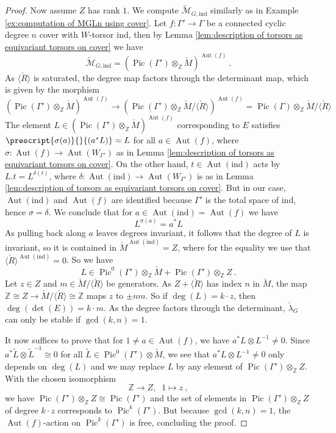 \documentclass[10pt, a4paper]{amsart}
\theoremstyle{definition}
\theoremstyle{myitemstyle}
\newcommand{\Z}{\mathbb{Z}}
\newcommand{\Mcheck}{{\check{M}}}
\newcommand{\lambdacheck}{\check{\lambda}}
\newcommand{\Rcheck}{\check{R}}
\newcommand{\wmc}[1]{{\widetilde{\mathcal{#1}}}}
\DeclareMathOperator{\Pic}{Pic}
\DeclareMathOperator{\Aut}{Aut}
\newcommand{\ind}{\mathrm{ind}}
\begin{document}
\begin{proof}
Now assume $Z$ has rank $1$.  We compute $\wmc M_{G,\ind}$ similarly as in Example \ref{ex:computation of MGLn using cover}. Let $f\colon \Gamma'\to \Gamma$ be a connected cyclic degree $n$ cover with $W$-torsor $\ind$, then by Lemma \ref{lem:description of torsors as equivariant torsors on cover} we have
\[
    \wmc M_{G,\ind}=(\Pic(\Gamma')\otimes_\Z \Mcheck)^{\Aut(f)} \ .
\]
As $\langle \Rcheck\rangle$ is saturated, the degree map factors through the determinant map, which is given by the morphism
\[
    \left(\Pic(\Gamma')\otimes_\Z \Mcheck\right)^{\Aut(f)}
        \to \left(\Pic(\Gamma')\otimes_\Z \Mcheck/\langle \Rcheck\rangle\right)^{\Aut(f)}
            = \Pic(\Gamma)\otimes_\Z \Mcheck/\langle\Rcheck\rangle 
\]
The element $L\in\left(\Pic(\Gamma')\otimes_\Z \Mcheck\right)^{\Aut(f)}$ corresponding to $E$ satisfies $\prescript{\sigma(a)}{}{(a^*L)}=L$ for all $a\in \Aut(f)$, where $\sigma\colon \Aut(f)\to \Aut(W_{\Gamma'})$ as in Lemma \ref{lem:description of torsors as equivariant torsors on cover}. On the other hand, $t\in\Aut(\ind)$ acts by $L.t=L^{\delta(t)}$, where $\delta\colon \Aut(\ind)\to \Aut(W_{\Gamma'})$ is as in Lemma \ref{lem:description of torsors as equivariant torsors on cover}. But in our case, $\Aut(\ind)$ and $\Aut(f)$ are identified because $\Gamma'$ is the total space of $\ind$, hence $\sigma=\delta$. We conclude that for $a\in \Aut(\ind)=\Aut(f)$ we have
\[
    L^{\sigma(a)}= a^*L
\]
As pulling back along $a$ leaves degrees invariant, it follows that the degree of $L$ is invariant, so it is contained in $\Mcheck^{\Aut(\ind)}=Z$, where for the equality we use that $\langle \Rcheck\rangle^{\Aut(\ind)}=0$. So we have
\[
    L\in \Pic^0(\Gamma')\otimes_\Z \Mcheck+ \Pic(\Gamma')\otimes_\Z Z \ .
\]
Let $z\in Z$ and $m\in \Mcheck/\langle \Rcheck\rangle$ be generators. As $Z+\langle\Rcheck\rangle$ has index $n$ in $\Mcheck$, the map $\Z\cong Z\to \Mcheck/\langle \Rcheck\rangle\cong \Z$ maps $z$ to $\pm n m$. So if $\deg(L)=k\cdot z$, then $\deg(\det(E))=k\cdot m$. As the degree factors through the determinant, $\lambdacheck_G$ can only be stable if $\gcd(k,n)=1$. 

It now suffices to prove that for $1\neq a\in \Aut(f)$, we have $a^*L\otimes L^{-1}\neq 0$. Since $a^*\widetilde{L}\otimes \widetilde{L}^{-1} \cong 0$ for all $\widetilde{L}\in \Pic^0(\Gamma')\otimes \Mcheck$, we see that $a^*L\otimes L^{-1}\neq 0$ only depends on $\deg(L)$ and we may replace $L$ by any element of $\Pic(\Gamma')\otimes_\Z Z$. With the chosen isomorphism 
\[
    \Z\to Z,\;\; 1\mapsto z \ ,
\]
we have $\Pic(\Gamma')\otimes_\Z Z\cong \Pic(\Gamma')$ and the set of elements in $\Pic(\Gamma')\otimes_\Z Z$ of degree $k\cdot z$ corresponds to $\Pic^k(\Gamma')$. But because $\gcd(k,n)=1$, the $\Aut(f)$-action on $\Pic^k(\Gamma')$ is free, concluding the proof.
\end{proof}
\end{document}
